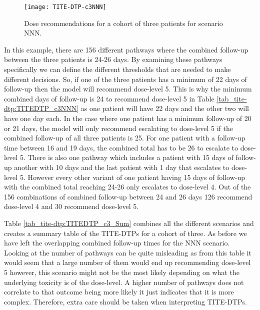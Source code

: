 \begin{figure}[H]
	\centering
	\caption{Dose recommendations for a cohort of three patients for scenario NNN.}
	\label{fig_tite-dtp:c3NNNprob}
	\texttt{[image: TITE-DTP-c3NNN]}
\end{figure}

In this example, there are 156 different pathways where the combined follow-up between the three patients is 24-26 days. By examining these pathways specifically we can define the different thresholds that are needed to make different decisions. So, if one of the three patients has a minimum of 22 days of follow-up then the model will recommend dose-level 5. This is why the minimum combined days of follow-up is 24 to recommend dose-level 5 in Table \ref{tab_tite-dtp:TITEDTP_c3NNN} as one patient will have 22 days and the other two will have one day each. In the case where one patient has a minimum follow-up of 20 or 21 days, the model will only recommend escalating to dose-level 5 if the combined follow-up of all three patients is 25. For one patient with a follow-up time between 16 and 19 days, the combined total has to be 26 to escalate to dose-level 5. There is also one pathway which includes a patient with 15 days of follow-up another with 10 days and the last patient with 1 day that escalates to dose-level 5. However every other variant of one patient having 15 days of follow-up with the combined total reaching 24-26 only escalates to dose-level 4. Out of the 156 combinations of combined follow-up between 24 and 26 days 126 recommend dose-level 4 and 30 recommend dose-level 5. 

Table \ref{tab_tite-dtp:TITEDTP_c3_Sum} combines all the different scenarios and creates a summary table of the TITE-DTPs for a cohort of three. As before we have left the overlapping combined follow-up times for the NNN scenario. Looking at the number of pathways can be quite misleading as from this table it would seem that a large number of them would end up recommending dose-level 5 however, this scenario might not be the most likely depending on what the underlying toxicity is of the dose-level. A higher number of pathways does not correlate to that outcome being more likely it just indicates that it is more complex. Therefore, extra care should be taken when interpreting TITE-DTPs. 

